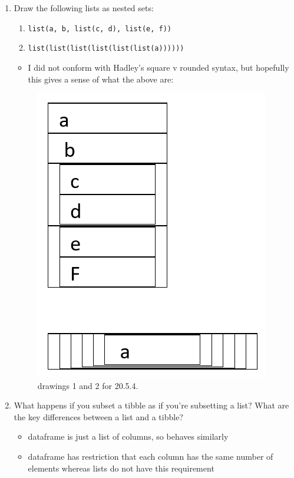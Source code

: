 \documentclass[]{book}
\providecommand{\tightlist}{%
  \setlength{\itemsep}{0pt}\setlength{\parskip}{0pt}}
\theoremstyle{definition}
\theoremstyle{definition}
\theoremstyle{definition}
\theoremstyle{remark}
\begin{document}
\begin{enumerate}
\def\labelenumi{\arabic{enumi}.}
\item
  Draw the following lists as nested sets:

  \begin{enumerate}
  \def\labelenumii{\arabic{enumii}.}
  \tightlist
  \item
    \texttt{list(a,\ b,\ list(c,\ d),\ list(e,\ f))}
  \item
    \texttt{list(list(list(list(list(list(a))))))}
  \end{enumerate}

  \begin{itemize}
  \tightlist
  \item
    I did not conform with Hadley's square v rounded syntax, but
    hopefully this gives a sense of what the above are:
  \end{itemize}

  \begin{figure}
  \centering
  \includegraphics{nested-lists.png}
  \caption{drawings 1 and 2 for 20.5.4.}
  \end{figure}
\item
  What happens if you subset a tibble as if you're subsetting a list?
  What are the key differences between a list and a tibble?

  \begin{itemize}
  \tightlist
  \item
    dataframe is just a list of columns, so behaves similarly
  \item
    dataframe has restriction that each column has the same number of
    elements whereas lists do not have this requirement
  \end{itemize}
\end{enumerate}
\end{document}
